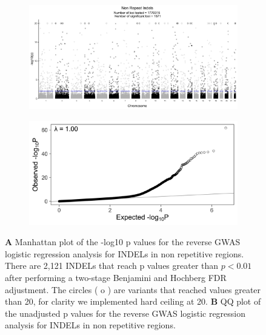 \documentclass[custompaper]{MBE}%
\begin{document}
\begin{figure} \centering
    \begin{subfigure}[b]{\linewidth}
        \includegraphics[width=\hsize]{./Figures/ManhattanPlot_NonRepeatIndels.jpg}
        \label{fig:a}
    \end{subfigure} %

    \begin{subfigure}[b]{\linewidth}
    	\center    
        \includegraphics[width=\hsize]{./Figures/QQPlot_NonRepeatIndels.jpg}
        \label{fig:b}    
    \end{subfigure} 
    \caption{\textbf{A} Manhattan plot of the -log10 p values for the reverse GWAS logistic regression analysis for INDELs in non repetitive regions. There are 2,121 INDELs that reach p values greater than $ p < 0.01$ after performing a two-stage Benjamini and Hochberg FDR adjustment.  The circles ( o ) are variants that reached values greater than 20, for clarity we implemented hard ceiling at 20. 
  \textbf{B} QQ plot of the unadjusted p values for the reverse GWAS logistic regression analysis for INDELs in non repetitive regions.}
  \label{NRI_Manhattan}
  \end{figure}
\end{document}
